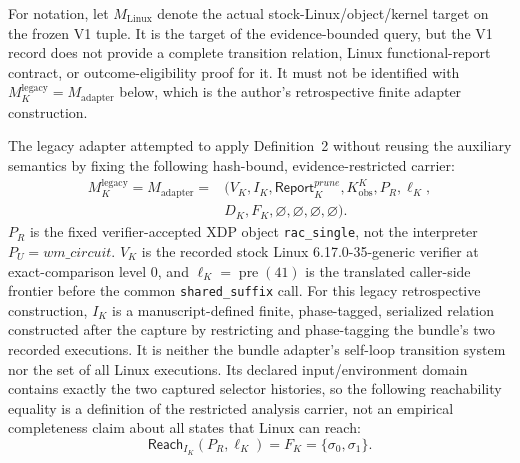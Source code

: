 \documentclass[conference]{IEEEtran}
\begin{document}
For notation, let $M_{\mathrm{Linux}}$ denote the actual stock-Linux/object/kernel target on the frozen V1 tuple. It is the target of the evidence-bounded query, but the V1 record does not provide a complete transition relation, Linux functional-report contract, or outcome-eligibility proof for it. It must not be identified with $M_K^{\mathrm{legacy}}=M_{\mathrm{adapter}}$ below, which is the author's retrospective finite adapter construction.

The legacy adapter attempted to apply Definition~2 without reusing the auxiliary semantics by fixing the following hash-bound, evidence-restricted carrier:
\begin{equation}
\begin{aligned}
M_K^{\mathrm{legacy}}=M_{\mathrm{adapter}}={}&(V_K,I_K,\mathsf{Report}^{\mathit{prune}}_K,K^K_{\mathrm{obs}},P_R,\ell_K,\\
&D_K,F_K,\varnothing,\varnothing,\varnothing,\varnothing).
\end{aligned}
\end{equation}
$P_R$ is the fixed verifier-accepted XDP object \texttt{rac\_single}, not the interpreter $P_U=\mathit{wm\_circuit}$. $V_K$ is the recorded stock Linux 6.17.0-35-generic verifier at exact-comparison level 0, and $\ell_K=\operatorname{pre}(41)$ is the translated caller-side frontier before the common \texttt{shared\_suffix} call. For this legacy retrospective construction, $I_K$ is a manuscript-defined finite, phase-tagged, serialized relation constructed after the capture by restricting and phase-tagging the bundle's two recorded executions. It is neither the bundle adapter's self-loop transition system nor the set of all Linux executions. Its declared input/environment domain contains exactly the two captured selector histories, so the following reachability equality is a definition of the restricted analysis carrier, not an empirical completeness claim about all states that Linux can reach:
\begin{equation}
\mathsf{Reach}_{I_K}(P_R,\ell_K)=F_K=\{\sigma_0,\sigma_1\}.
\end{equation}
\end{document}
